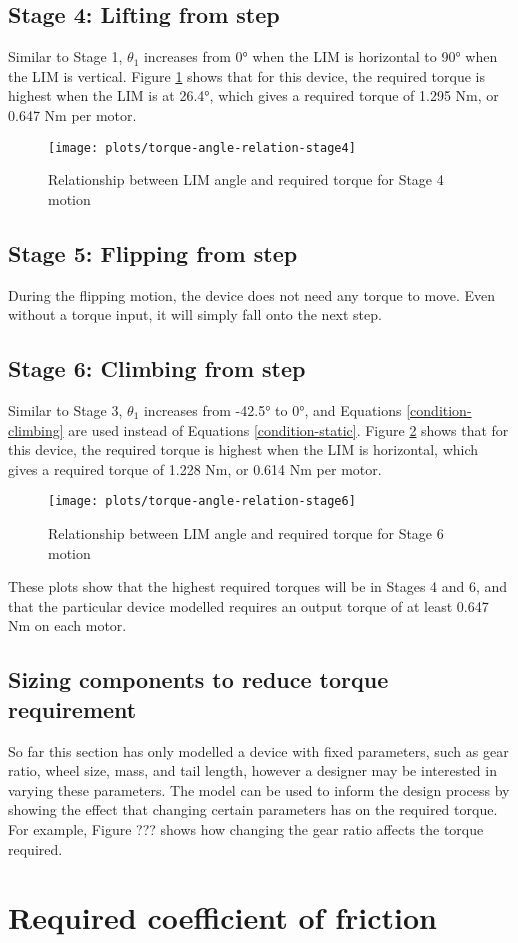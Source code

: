 \subsection*{Stage 4: Lifting from step}
Similar to Stage 1, $\theta_1$ increases from 0° when the LIM is horizontal to 90° when the LIM is vertical. Figure \ref{torque-angle-relation-stage4} shows that for this device, the required torque is highest when the LIM is at 26.4°, which gives a required torque of 1.295 Nm, or 0.647 Nm per motor.
\begin{figure}[h]
	\centering
	\texttt{[image: plots/torque-angle-relation-stage4]}
	\caption{Relationship between LIM angle and required torque for Stage 4 motion}
	\label{torque-angle-relation-stage4}
\end{figure}


\subsection*{Stage 5: Flipping from step}
During the flipping motion, the device does not need any torque to move. Even without a torque input, it will simply fall onto the next step.

\subsection*{Stage 6: Climbing from step}
Similar to Stage 3, $\theta_1$ increases from -42.5° to 0°, and Equations \ref{condition-climbing} are used instead of Equations \ref{condition-static}. Figure \ref{torque-angle-relation-stage6} shows that for this device, the required torque is highest when the LIM is horizontal, which gives a required torque of 1.228 Nm, or 0.614 Nm per motor.
\begin{figure}[h]
	\centering
	\texttt{[image: plots/torque-angle-relation-stage6]}
	\caption{Relationship between LIM angle and required torque for Stage 6 motion}
	\label{torque-angle-relation-stage6}
\end{figure}
These plots show that the highest required torques will be in Stages 4 and 6, and that the particular device modelled requires an output torque of at least 0.647 Nm on each motor.

\subsection{Sizing components to reduce torque requirement}
So far this section has only modelled a device with fixed parameters, such as gear ratio, wheel size, mass, and tail length, however a designer may be interested in varying these parameters. The model can be used to inform the design process by showing the effect that changing certain parameters has on the required torque. For example, Figure ??? shows how changing the gear ratio affects the torque required.



\section{Required coefficient of friction}


